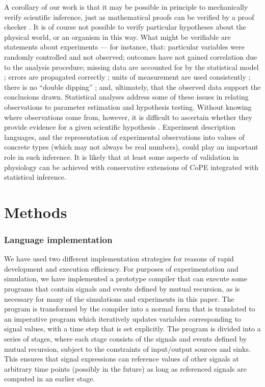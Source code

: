 A corollary of our work is that it may be possible in principle to
mechanically verify scientific inference, just as mathematical proofs
can be verified by a proof checker \cite{DeBruijn1968,
  Harrison2009}. It is of course not possible to verify particular
hypotheses about the physical world, or an organism in this way. What
might be verifiable are statements about experiments --- for instance,
that: particular variables were randomly controlled and not observed;
outcomes have not gained correlation due to the analysis procedure;
missing data are accounted for by the statistical model
\cite{Gelman2003}; errors are propagated correctly \cite{Taylor1997};
units of measurement are used consistently \cite{Kennedy1997}; there
is no ``double dipping'' \cite{Kriegeskorte2009}; and, ultimately,
that the observed data support the conclusions drawn. Statistical
analyses address some of these issues in relating observations to
parameter estimation and hypothesis testing. Without knowing
where observations come from, however, it is difficult to ascertain whether
they provide evidence for a given scientific hypothesis
\cite{Pool2002}. Experiment description languages, and the
representation of experimental observations into values of concrete
types (which may not always be real numbers), could play an important
role in such inference. It is likely that at least some aspects of
validation in physiology can be achieved with conservative extensions
of
CoPE integrated with statistical inference.

\section*{Methods}

\subsubsection*{Language implementation} 

We have used two different implementation strategies for reasons of
rapid development and execution efficiency. For purposes of
experimentation and simulation, we have implemented a prototype
compiler that can execute some programs that contain signals and
events defined by mutual recursion, as is necessary for many of the
simulations and experiments in this paper. The program is transformed
by the compiler into a normal form that is translated to an imperative
program which iteratively updates variables corresponding to signal
values, with a time step that is set explicitly. The program is
divided into a series of stages, where each stage consists of the
signals and events defined by mutual recursion, subject to the
constraints of input/output sources and sinks. This ensures that
signal expressions can reference values of other signals at arbitrary
time points (possibly in the future) as long as referenced signals are
computed in an earlier stage.


